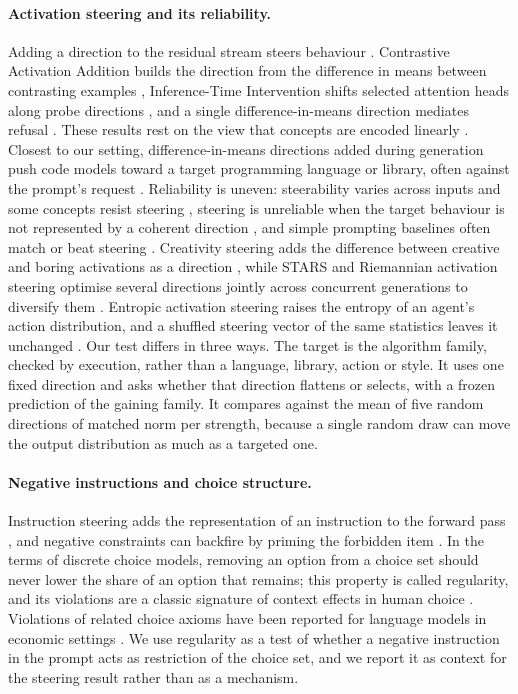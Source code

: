 \documentclass[11pt,letterpaper]{article}
\begin{document}
\paragraph{Activation steering and its reliability.} Adding a direction to the residual stream steers behaviour \citep{Turner2023,Zou2023}. Contrastive Activation Addition builds the direction from the difference in means between contrasting examples \citep{Rimsky2024}, Inference-Time Intervention shifts selected attention heads along probe directions \citep{Li2023}, and a single difference-in-means direction mediates refusal \citep{Arditi2024}. These results rest on the view that concepts are encoded linearly \citep{Park2023}. Closest to our setting, difference-in-means directions added during generation push code models toward a target programming language or library, often against the prompt's request \citep{Rahman2026}. Reliability is uneven: steerability varies across inputs and some concepts resist steering \citep{Tan2024}, steering is unreliable when the target behaviour is not represented by a coherent direction \citep{Braun2025}, and simple prompting baselines often match or beat steering \citep{Wu2025}. Creativity steering adds the difference between creative and boring activations as a direction \citep{Olson2024}, while STARS and Riemannian activation steering optimise several directions jointly across concurrent generations to diversify them \citep{Zhu2026,Khanh2025}. Entropic activation steering raises the entropy of an agent's action distribution, and a shuffled steering vector of the same statistics leaves it unchanged \citep{Rahn2024}. Our test differs in three ways. The target is the algorithm family, checked by execution, rather than a language, library, action or style. It uses one fixed direction and asks whether that direction flattens or selects, with a frozen prediction of the gaining family. It compares against the mean of five random directions of matched norm per strength, because a single random draw can move the output distribution as much as a targeted one.

\paragraph{Negative instructions and choice structure.} Instruction steering adds the representation of an instruction to the forward pass \citep{Stolfo2024}, and negative constraints can backfire by priming the forbidden item \citep{Rana2026}. In the terms of discrete choice models, removing an option from a choice set should never lower the share of an option that remains; this property is called regularity, and its violations are a classic signature of context effects in human choice \citep{Huber1982}. Violations of related choice axioms have been reported for language models in economic settings \citep{Buchanan2026}. We use regularity as a test of whether a negative instruction in the prompt acts as restriction of the choice set, and we report it as context for the steering result rather than as a mechanism.
\end{document}
